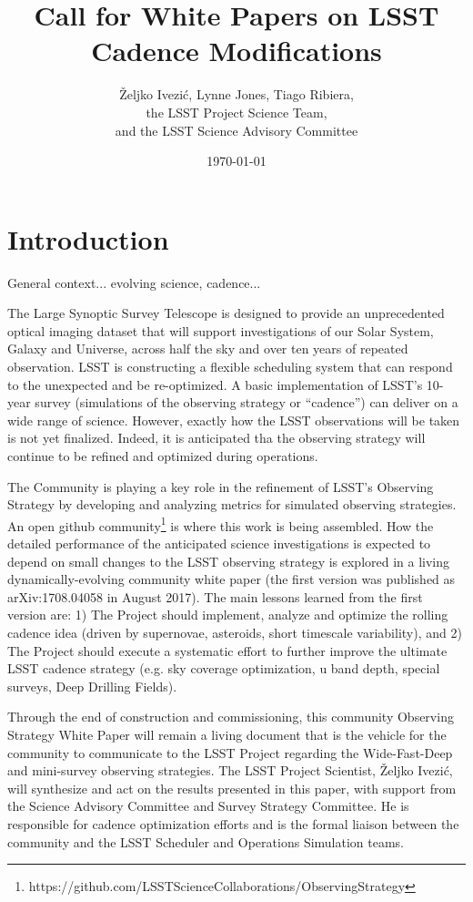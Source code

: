 \documentclass[DM,lsstdraft,toc,usenatbib]{lsstdoc}
\title[Call for LSST Cadence White Papers]{Call for White Papers on LSST Cadence Modifications}
\author{\v{Z}eljko Ivezi\'{c}, Lynne Jones, Tiago Ribiera, 
             \\  the LSST Project Science Team, 
              \\ and  the LSST Science Advisory Committee}
\date{\today}
\begin{document}
\maketitle

\section{Introduction} 

General context... evolving science, cadence...

The Large Synoptic Survey Telescope is designed to provide an unprecedented optical 
imaging dataset that will support investigations of our Solar System, Galaxy and Universe, 
across half the sky and over ten years of repeated observation. LSST is constructing a 
flexible scheduling system that can respond to the unexpected 
and be re-optimized. A basic implementation of LSST's 10-year survey (simulations of 
the observing strategy or ``cadence'') can deliver on a wide range of science. 
However, exactly how the LSST observations will be taken is not yet finalized. Indeed, 
it is anticipated tha the observing strategy will continue to be refined and optimized 
during operations.

The Community is playing a key role in the refinement of LSST’s Observing Strategy by 
developing and analyzing metrics for simulated observing strategies.
An open github community\footnote{
https://github.com/LSSTScienceCollaborations/ObservingStrategy}
is where this work is being assembled. How the detailed performance of the anticipated 
science investigations is expected to depend on small changes to the LSST observing 
strategy is explored in a living dynamically-evolving community white paper (the first
version was published as arXiv:1708.04058 in August 2017). The main lessons 
learned from the first version are: 1) The Project should implement, analyze and optimize 
the rolling cadence idea (driven by supernovae, asteroids, short timescale variability),
and 2) The Project should execute a systematic effort to further improve the ultimate 
LSST cadence strategy (e.g. sky coverage optimization, u band depth, special surveys, 
Deep Drilling Fields).

Through the end of construction and commissioning, this community Observing Strategy 
White Paper will remain a living document that is the vehicle for the community to 
communicate to the LSST Project regarding the Wide-Fast-Deep and mini-survey observing 
strategies. The LSST Project Scientist, \v{Z}eljko Ivezi\'{c}, will synthesize and act on the 
results presented in this paper, with support from the Science Advisory Committee and 
Survey Strategy Committee. He is responsible for cadence optimization efforts and is the 
formal liaison between the community and the LSST Scheduler and Operations Simulation teams.
\end{document}
